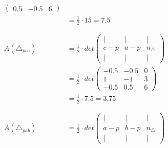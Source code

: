 \documentclass{article}
\begin{document}
\[\begin{aligned}
\begin{pmatrix}
                                                         0.5 & -0.5 & 6
                                                     \end{pmatrix}           \\
                           & = \frac{1}{2} \cdot 15 = 7.5                   \\
                           &                                                   \\
                           &                                                   \\
        A(\triangle_{pca}) & = \frac{1}{2} \cdot det \begin{pmatrix}
                                                         |   & |   & |             \\
                                                         c-p & a-p & n_{\triangle} \\
                                                         |   & |   & |
                                                     \end{pmatrix} \\
                           & = \frac{1}{2} \cdot det \begin{pmatrix}
                                                         -0.5 & -0.5 & 0 \\
                                                         1    & -1   & 3 \\
                                                         -0.5 & 0.5 & 6
                                                     \end{pmatrix}           \\
                           & = \frac{1}{2} \cdot 7.5 = 3.75                  \\
                           &                                                   \\
                           &                                                   \\
        A(\triangle_{pab}) & = \frac{1}{2} \cdot det \begin{pmatrix}
                                                         |   & |   & |             \\
                                                         a-p & b-p & n_{\triangle} \\
                                                         |   & |   & |
                                                     \end{pmatrix} \\

\end{aligned}\]
\end{document}
